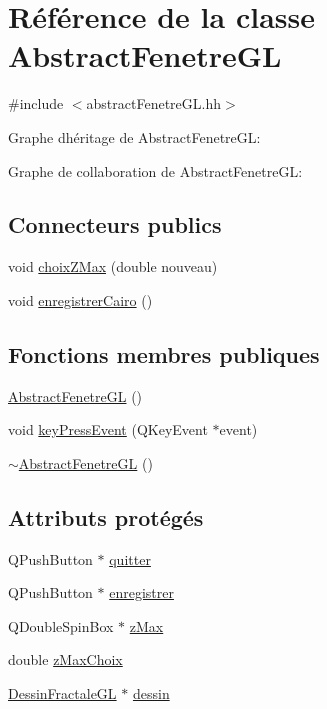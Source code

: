 \hypertarget{classAbstractFenetreGL}{}\section{Référence de la classe Abstract\+Fenetre\+GL}
\label{classAbstractFenetreGL}


{\ttfamily \#include $<$abstract\+Fenetre\+G\+L.\+hh$>$}



Graphe d\textquotesingle{}héritage de Abstract\+Fenetre\+GL\+:


Graphe de collaboration de Abstract\+Fenetre\+GL\+:
\subsection*{Connecteurs publics}
\begin{DoxyCompactItemize}
\item 
void \hyperlink{classAbstractFenetreGL_a97c30b1012a2eaa09bb3aed0403ff595}{choix\+Z\+Max} (double nouveau)
\item 
void \hyperlink{classAbstractFenetreGL_a797d71f2fa925e48139acb92a3f65ad6}{enregistrer\+Cairo} ()
\end{DoxyCompactItemize}
\subsection*{Fonctions membres publiques}
\begin{DoxyCompactItemize}
\item 
\hyperlink{classAbstractFenetreGL_a48a1ccd1d08fb471401b37cebed8fd74}{Abstract\+Fenetre\+GL} ()
\item 
void \hyperlink{classAbstractFenetreGL_a22c2d178dafd49d27bc4a46f5b7fca3a}{key\+Press\+Event} (Q\+Key\+Event $\ast$event)
\item 
\hyperlink{classAbstractFenetreGL_a848254ecf6e365f84bec581900b17d65}{$\sim$\+Abstract\+Fenetre\+GL} ()
\end{DoxyCompactItemize}
\subsection*{Attributs protégés}
\begin{DoxyCompactItemize}
\item 
Q\+Push\+Button $\ast$ \hyperlink{classAbstractFenetreGL_a9a6afd314ca26783a174dbbf7e971663}{quitter}
\item 
Q\+Push\+Button $\ast$ \hyperlink{classAbstractFenetreGL_abedb0e82fbaa31bd23d7c492f2127569}{enregistrer}
\item 
Q\+Double\+Spin\+Box $\ast$ \hyperlink{classAbstractFenetreGL_ac498e1d44e943dd727a10d949056f2d3}{z\+Max}
\item 
double \hyperlink{classAbstractFenetreGL_a9cae32dc34af644ca71cdc80d0e77558}{z\+Max\+Choix}
\item 
\hyperlink{classDessinFractaleGL}{Dessin\+Fractale\+GL} $\ast$ \hyperlink{classAbstractFenetreGL_aeff85358aaa43260f9af20e40394ea68}{dessin}
\end{DoxyCompactItemize}


